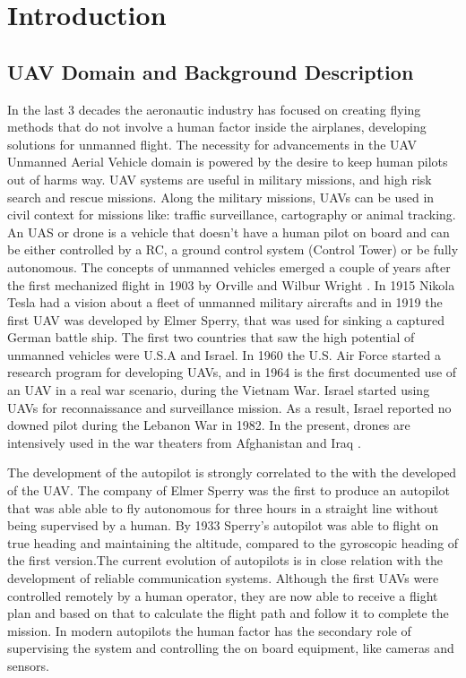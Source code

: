 \chapter{Introduction}
\label{chapter:intro}

\section{UAV Domain and Background Description}
\label{sec:domain}
In the last 3 decades the aeronautic industry has focused on creating flying methods 
that do not involve a human factor inside the airplanes, developing
solutions for unmanned flight. The necessity for advancements in the UAV
{Unmanned Aerial Vehicle} domain is powered by the desire to keep human pilots 
out of harms way. UAV systems are useful in military missions, and high risk 
search and rescue missions. Along the military missions, UAVs can be used in 
civil context for missions like: traffic surveillance, cartography or animal 
tracking. An UAS or drone is a vehicle that doesn't have
a human pilot on board and can be either controlled by a RC, 
a ground control system (Control Tower) or be fully autonomous. The concepts of 
unmanned vehicles emerged a couple of years after the first mechanized flight
in 1903 by Orville and Wilbur Wright \cite{learning-to-fly}. In 1915 Nikola
Tesla had a vision about a fleet of unmanned military aircrafts and in 1919 
the first UAV was developed by Elmer Sperry, that was used for sinking a captured
German battle ship. The first two countries that saw the high potential of unmanned vehicles were
U.S.A and Israel. In 1960 the U.S. Air Force started a research program for
developing UAVs,  and in 1964 is the first documented use of an UAV in a real
war scenario,  during the Vietnam War. Israel started using UAVs for 
reconnaissance and surveillance mission. As a result, Israel reported no downed 
pilot during the Lebanon War in 1982. In the present,  drones are intensively 
used in the war theaters from Afghanistan and Iraq \cite{eyes-of-the-army}.

The development of the autopilot is strongly correlated to the with the 
developed of the UAV. The company of Elmer Sperry was the first to produce
an autopilot that was able able to fly autonomous for three hours in a straight
line without being supervised by a human. By 1933 Sperry's autopilot was able to
flight on true heading and maintaining the altitude,  compared to the gyroscopic
heading of the first version.The current evolution of autopilots is in close relation with the development
of reliable communication systems. Although the first UAVs were controlled
remotely by a human operator,  they are now able to receive a flight plan
and based on that to calculate the flight path and follow it to complete the 
mission. In modern autopilots the human factor has the secondary role of supervising
the system and controlling the on board equipment, like cameras and sensors. 

